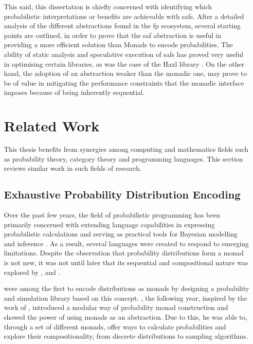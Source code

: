\documentclass[
  oneside,
  11pt, a4paper,
  footinclude=true,
  headinclude=true,
  cleardoublepage=empty
]{scrbook}
\theoremstyle{definition}
\theoremstyle{definition}
\begin{document}
    This said, this dissertation is chiefly concerned with identifying which probabilistic interpretations or benefits are achievable with \glspl{saf}. After a detailed analysis of the different abstractions found in the \gls{fp} ecosystem, several starting points are outlined, in order to
    prove that the \gls{saf} abstraction is useful in providing a more efficient solution than Monads to encode probabilities. The ability of static analysis and speculative execution of \glspl{saf} has proved very useful in optimising certain libraries, as was the case of the Haxl library \citep{Marlow:2014:NFA:2692915.2628144, andrey2019selective}. On the other hand, the adoption of an abstraction weaker than the monadic one, may prove to be of value in mitigating the performance constraints that the monadic interface imposes because of being inherently sequential.
	            
	\section{Related Work}\label{sec-related-work}
	    
    This thesis benefits from synergies among computing and mathematics fields such as probability theory, category theory and programming languages. This section reviews similar work in such fields of research.

        \subsection{Exhaustive Probability Distribution Encoding}
        
    Over the past few years, the field of probabilistic programming has been primarily concerned with extending language capabilities in expressing probabilistic calculations and serving as practical tools for Bayesian modelling and inference \citep{erwig_kollmansberger_2006}. As a result, several languages were created to respond to emerging limitations. Despite the observation that probability distributions form a monad is not new, it was not until later that its sequential and compositional nature was explored by \cite{Ramsey:2002:SLC:565816.503288}, \cite{Goodman:2013:PPP:2480359.2429117} and \cite{Gordon:2013:MPB:2429069.2429119}.
        
        \cite{erwig_kollmansberger_2006} were among the first to encode  distributions as monads by designing a probability and simulation library based on this concept. \cite{kidd2007build}, the following year, inspired by the work of \cite{Ramsey:2002:SLC:565816.503288}, introduced a modular way of probability monad construction and showed the power of using monads as an abstraction. Due to this, he was able to, through a set of different monads, offer ways to calculate probabilities and explore their compositionality, from discrete distributions to sampling algorithms.
                
\end{document}
